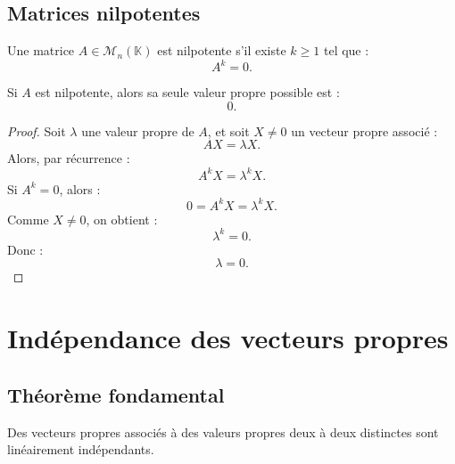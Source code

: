 \documentclass[11pt,a4paper]{article}
\newcommand{\K}{\mathbb K}
\newcommand{\M}{\mathcal M}
\begin{document}
\subsection{Matrices nilpotentes}

\begin{definitionbox}
Une matrice \(A\in\M_n(\K)\) est nilpotente s'il existe \(k\geq1\) tel que :
\[
A^k=0.
\]
\end{definitionbox}

\begin{theorembox}
Si \(A\) est nilpotente, alors sa seule valeur propre possible est :
\[
0.
\]
\end{theorembox}

\begin{proof}
Soit \(\lambda\) une valeur propre de \(A\), et soit \(X\neq0\) un vecteur propre associé :
\[
AX=\lambda X.
\]
Alors, par récurrence :
\[
A^kX=\lambda^kX.
\]
Si \(A^k=0\), alors :
\[
0=A^kX=\lambda^kX.
\]
Comme \(X\neq0\), on obtient :
\[
\lambda^k=0.
\]
Donc :
\[
\lambda=0.
\]
\end{proof}

\section{Indépendance des vecteurs propres}

\subsection{Théorème fondamental}

\begin{theorembox}
Des vecteurs propres associés à des valeurs propres deux à deux distinctes sont linéairement indépendants.
\end{theorembox}
\end{document}
